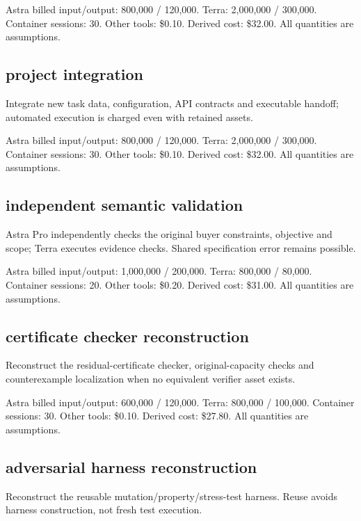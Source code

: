 \documentclass[10pt]{article}
\newcommand{\usd}[1]{\$#1}
\begin{document}
Astra billed input/output: 800,000 / 120,000. Terra: 2,000,000 / 300,000. Container sessions: 30. Other tools: \usd{0.10}. Derived cost: \usd{32.00}. All quantities are assumptions.

\subsection*{project integration}

Integrate new task data, configuration, API contracts and executable handoff; automated execution is charged even with retained assets.

Astra billed input/output: 800,000 / 120,000. Terra: 2,000,000 / 300,000. Container sessions: 30. Other tools: \usd{0.10}. Derived cost: \usd{32.00}. All quantities are assumptions.

\subsection*{independent semantic validation}

Astra Pro independently checks the original buyer constraints, objective and scope; Terra executes evidence checks. Shared specification error remains possible.

Astra billed input/output: 1,000,000 / 200,000. Terra: 800,000 / 80,000. Container sessions: 20. Other tools: \usd{0.20}. Derived cost: \usd{31.00}. All quantities are assumptions.

\subsection*{certificate checker reconstruction}

Reconstruct the residual-certificate checker, original-capacity checks and counterexample localization when no equivalent verifier asset exists.

Astra billed input/output: 600,000 / 120,000. Terra: 800,000 / 100,000. Container sessions: 30. Other tools: \usd{0.10}. Derived cost: \usd{27.80}. All quantities are assumptions.

\subsection*{adversarial harness reconstruction}

Reconstruct the reusable mutation/property/stress-test harness. Reuse avoids harness construction, not fresh test execution.
\end{document}
